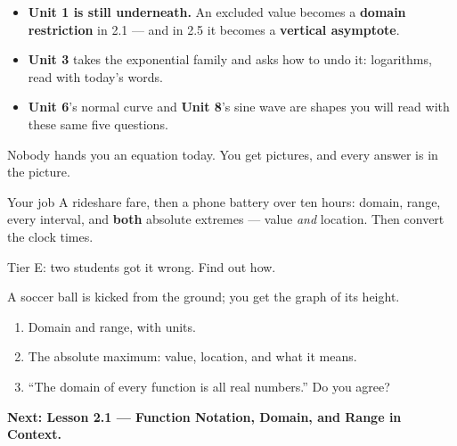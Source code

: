 \documentclass[aspectratio=169, 11pt]{beamer}
\begin{document}
\begin{frame}[t, plain]
  \begin{itemize}
    \setlength{\itemsep}{0.4cm}
    \item \textbf{Unit 1 is still underneath.} An excluded value becomes a \textbf{domain
          restriction} in 2.1 --- and in 2.5 it becomes a \textbf{vertical asymptote}.
    \item \textbf{Unit 3} takes the exponential family and asks how to undo it: logarithms, read
          with today's words.
    \item \textbf{Unit 6}'s normal curve and \textbf{Unit 8}'s sine wave are shapes you will read
          with these same five questions.
  \end{itemize}
\end{frame}

\begin{frame}[t, plain]
  Nobody hands you an equation today. You get pictures, and every answer is in the picture.
  \begin{block}{Your job}
    A rideshare fare, then a phone battery over ten hours: domain, range, every interval, and
    \textbf{both} absolute extremes --- value \emph{and} location. Then convert the clock times.
  \end{block}
  \vspace{0.2cm}
  Tier E: two students got it wrong. Find out how.
\end{frame}

\begin{frame}[t, plain]
  A soccer ball is kicked from the ground; you get the graph of its height.
  \begin{enumerate}
    \setlength{\itemsep}{0.35cm}
    \item Domain and range, with units.
    \item The absolute maximum: value, location, and what it means.
    \item ``The domain of every function is all real numbers.'' Do you agree?
  \end{enumerate}
  \vspace{0.3cm}
  {\color{royal}\bfseries Next: Lesson 2.1 --- Function Notation, Domain, and Range in Context.}
\end{frame}
\end{document}
